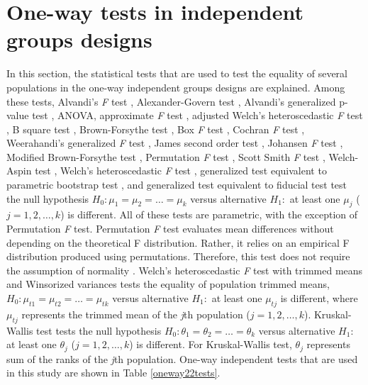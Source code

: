 \section{One-way tests in independent groups designs}\label{method}
In this section, the statistical tests that are used to test the equality of several populations in the one-way independent groups designs are explained. Among these tests, Alvandi's \textit{F} test \citep{sadooghi2012}, Alexander-Govern test \citep{alexander1994}, Alvandi's generalized p-value test \citep{sadooghi2012}, ANOVA, approximate \textit{F} test \citep{asiribo1990coping}, adjusted Welch's heteroscedastic \textit{F} test \citep{WELCH:1951}, B square test \citep{ozdemir2006one}, Brown-Forsythe test \citep{brown1974a, brown1974b}, Box \textit{F} test \citep{lix1998trim}, Cochran \textit{F} test \citep{cochran1937}, Weerahandi’s generalized \textit{F} test \citep{weerahandi1995}, James second order test \citep{JAMES:1951, JAMES:1954}, Johansen \textit{F} test \citep{johansen1980welch}, Modified Brown-Forsythe test \citep{mehrotra1997improving}, Permutation \textit{F} test \citep{berry2002fisher}, Scott Smith \textit{F} test \citep{scott1971interval}, Welch-Aspin test \citep{aspin1948}, Welch's heteroscedastic \textit{F} test \citep{WELCH:1951}, generalized test equivalent to parametric bootstrap test \citep{weerahandi2019}, and generalized test equivalent to fiducial test \citep{weerahandi2019} test the null hypothesis $H_0: \mu_1=\mu_2= \ldots =\mu_k$ versus alternative $H_1:$ at least one $\mu_j$ ($j=1,2,\ldots, k$) is different.
All of these tests are parametric, with the exception of Permutation \textit{F} test. Permutation \textit{F} test evaluates mean differences without depending on the theoretical F distribution. Rather, it relies on an empirical F distribution produced using permutations. Therefore, this test does not require the assumption of normality \citep{winkler2014}.
Welch's heteroscedastic \textit{F} test with trimmed means and Winsorized variances \citep{WELCH:1951} tests the equality of population trimmed means, $H_0: \mu_{t1}=\mu_{t2}= \ldots =\mu_{tk}$ versus alternative $H_1:$ at least one $\mu_{tj}$ is different, where $\mu_{tj}$ represents the trimmed mean of the \textit{j}th population ($j=1,2,\ldots, k$). Kruskal-Wallis test \citep{kruskal1952} tests the null hypothesis $H_0: \theta_1=\theta_2= \ldots =\theta_k$ versus alternative $H_1:$ at least one $\theta_j$ ($j=1,2,\ldots, k$) is different. For Kruskal-Wallis test, $\theta_j$ represents sum of the ranks of the \textit{j}th population.
One-way independent tests that are used in this study are shown in Table \ref{oneway22tests}.  

